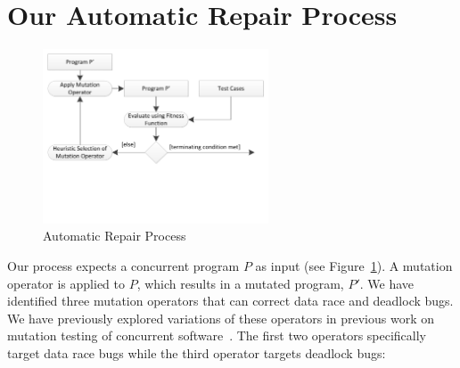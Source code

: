 \documentclass[10pt, conference, compsocconf]{IEEEtran}
\begin{document}
\section{Our Automatic Repair Process}
\label{sec:genetic_algorithm}


\begin{figure}[!t]
\centering
\includegraphics[width=6.7cm]{figures/process.pdf}
\caption{Automatic Repair Process}
\label{fig:process}
\end{figure}

Our process expects a concurrent program $P$ as input (see Figure~\ref{fig:process}). A mutation operator is applied to $P$, which results in a mutated program, $P'$. We have identified three mutation operators that can correct data race and deadlock bugs. We have previously explored variations of these operators in previous work on mutation testing of concurrent software~\cite{BCD06b}. %
The first two operators specifically target data race bugs while the third operator targets deadlock bugs:%
\end{document}
